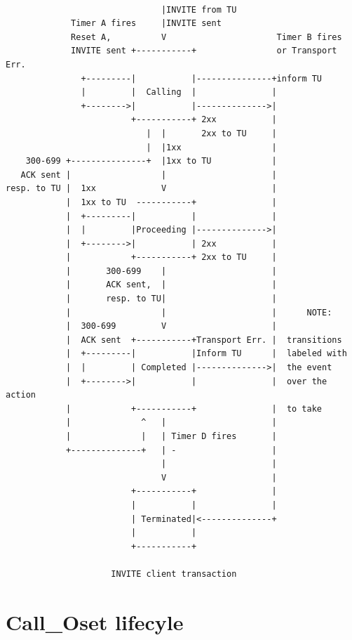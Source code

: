 \documentclass[a4paper]{article}
\begin{document}
\pagebreak
\begin{verbatim}

                               |INVITE from TU
             Timer A fires     |INVITE sent
             Reset A,          V                      Timer B fires
             INVITE sent +-----------+                or Transport Err.
               +---------|           |---------------+inform TU
               |         |  Calling  |               |
               +-------->|           |-------------->|
                         +-----------+ 2xx           |
                            |  |       2xx to TU     |
                            |  |1xx                  |
    300-699 +---------------+  |1xx to TU            |
   ACK sent |                  |                     |
resp. to TU |  1xx             V                     |
            |  1xx to TU  -----------+               |
            |  +---------|           |               |
            |  |         |Proceeding |-------------->|
            |  +-------->|           | 2xx           |
            |            +-----------+ 2xx to TU     |
            |       300-699    |                     |
            |       ACK sent,  |                     |
            |       resp. to TU|                     |
            |                  |                     |      NOTE:
            |  300-699         V                     |
            |  ACK sent  +-----------+Transport Err. |  transitions
            |  +---------|           |Inform TU      |  labeled with
            |  |         | Completed |-------------->|  the event
            |  +-------->|           |               |  over the action
            |            +-----------+               |  to take
            |              ^   |                     |
            |              |   | Timer D fires       |
            +--------------+   | -                   |
                               |                     |
                               V                     |
                         +-----------+               |
                         |           |               |
                         | Terminated|<--------------+
                         |           |
                         +-----------+

                     INVITE client transaction

\end{verbatim}


\section{Call\_Oset lifecyle}
\end{document}
